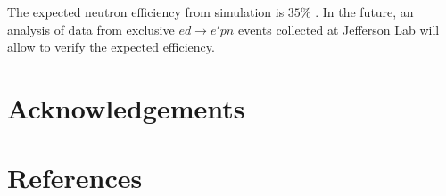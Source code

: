 \documentclass[3p,final,twocolumn]{elsarticle}
\begin{document}
The expected neutron efficiency from simulation is $35$\% . In the future, an analysis of data from exclusive $ed \rightarrow e'pn$ events collected at Jefferson Lab will allow to verify the expected efficiency.


\section{Acknowledgements}



\section*{References}



 
 \clearpage
\end{document}
